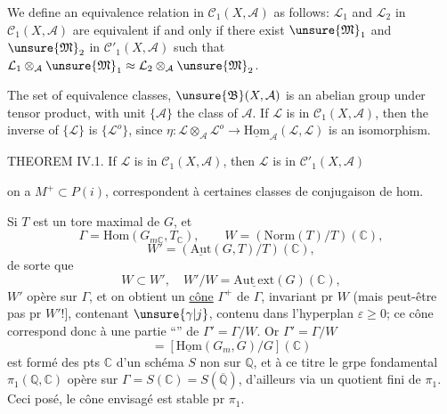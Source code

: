 We define an equivalence relation in $\mathcal{C}_1(X,\mathcal{A})$ as follows: $\mathcal{L}_1$ and $\mathcal{L}_2$ in $\mathcal{C}_1(X,\mathcal{A})$ are equivalent if and only if there exist $\unsure{\mathfrak{M}}_1$ and $\unsure{\mathfrak{M}}_2$ in $\mathcal{C}'_1(X,\mathcal{A})$ such that $\mathcal{L}_1\otimes_{\mathcal{A}}\unsure{\mathfrak{M}}_1\approx\mathcal{L}_2\otimes_{\mathcal{A}}\unsure{\mathfrak{M}}_2$.

The set of equivalence classes, $\unsure{\mathfrak{B}}(X,\mathcal{A})$ is an abelian group under tensor product, with unit $\{\mathcal{A}\}$ the class of $\mathcal{A}$. If $\mathcal{L}$ is in $\mathcal{C}_1(X,\mathcal{A})$, then the inverse of $\{\mathcal{L}\}$ is $\{\mathcal{L}^o\}$, since $\eta:\mathcal{L}\otimes_{\mathcal{A}}\mathcal{L}^o\longrightarrow\underline{\mathrm{Hom}}_{\mathcal{A}}(\mathcal{L},\mathcal{L})$ is an isomorphism.

THEOREM IV.1. If $\mathcal{L}$ is in $\mathcal{C}_1(X,\mathcal{A})$, then $\mathcal{L}$ is in $\mathcal{C}'_1(X,\mathcal{A})$



on a $M^+\subset P(i)$,  correspondent à certaines classes de conjugaison de hom.

Si $T$ est un tore maximal de $G$, et
\[
\Gamma=\mathrm{Hom}(G_{m\mathbb{C}},T_{\mathbb{C}}),\qquad W=(\mathrm{Norm}(T)/T)(\mathbb{C}),
\]
\[
W'=(\underline{\mathrm{Aut}}(G,T)/T)(\mathbb{C}),
\]
de sorte que
\[
W\subset W',\quad W'/W=\underline{\mathrm{Aut\ ext}}(G)(\mathbb{C}),
\]
$W'$ opère sur $\Gamma$, et on obtient un \uline{cône}  $\Gamma^+$ de $\Gamma$, invariant pr $W$ (mais peut-être pas pr $W'$!], contenant $\unsure{\gamma|j}$, contenu dans l'hyperplan $\varepsilon\geq0$;
 ce cône correspond donc à une partie ``'' de $\Gamma'=\Gamma/W$. Or $\Gamma'=\Gamma/W$
\[
=[\underline{\mathrm{Hom}}(G_m,G)/G](\mathbb{C})
\]
est formé des pts   $\mathbb{C}$ d'un schéma  $S$ non  sur $\mathbb{Q}$, et à ce titre le grpe fondamental $\pi_1(\mathbb{Q},\mathbb{C})$ opère sur  $\Gamma=S(\mathbb{C})=S(\overline{\mathbb{Q}})$, d'ailleurs via un quotient fini de $\pi_1$. Ceci posé, le cône envisagé  est stable pr $\pi_1$.



